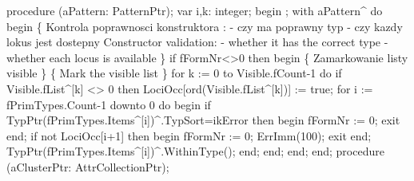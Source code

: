 \nwenddocs{}\endmoddef\nwstartdeflinemarkup{}\nwenddeflinemarkup
procedure (aPattern: PatternPtr);
var
   i,k: integer;
begin
   ;
   with aPattern^ do
   begin
      \{ Kontrola poprawnosci konstruktora :
        - czy ma poprawny typ
        - czy kazdy lokus jest dostepny
      Constructor validation:
        - whether it has the correct type
        - whether each locus is available \}
      if fFormNr<>0 then
      begin
         \{ Zamarkowanie listy visible \} \{ Mark the visible list \}
         for k := 0 to Visible.fCount-1 do
            if Visible.fList^[k] <> 0 then
               LociOcc[ord(Visible.fList^[k])] := true;
         for i := fPrimTypes.Count-1 downto 0 do
         begin
            if TypPtr(fPrimTypes.Items^[i])^.TypSort=ikError
            then begin fFormNr := 0; exit end;
            if not LociOcc[i+1] then
            begin fFormNr := 0; ErrImm(100); exit end;
            TypPtr(fPrimTypes.Items^[i])^.WithinType();
         end;
      end;
   end;
end;
\eatline
{}\nwendcode{}\nwdocspar
\nwenddocs{}\endmoddef\nwstartdeflinemarkup{}\nwenddeflinemarkup
procedure (aClusterPtr: AttrCollectionPtr);
